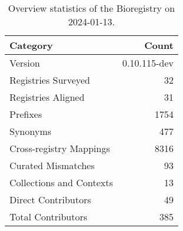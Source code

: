 \begin{table}
\caption{Overview statistics of the Bioregistry on 2024-01-13.}
\label{tab:bioregistry-summary}
\begin{tabular}{lr}
\toprule
Category & Count \\
\midrule
Version & 0.10.115-dev \\
Registries Surveyed & 32 \\
Registries Aligned & 31 \\
Prefixes & 1754 \\
Synonyms & 477 \\
Cross-registry Mappings & 8316 \\
Curated Mismatches & 93 \\
Collections and Contexts & 13 \\
Direct Contributors & 49 \\
Total Contributors & 385 \\
\bottomrule
\end{tabular}
\end{table}

